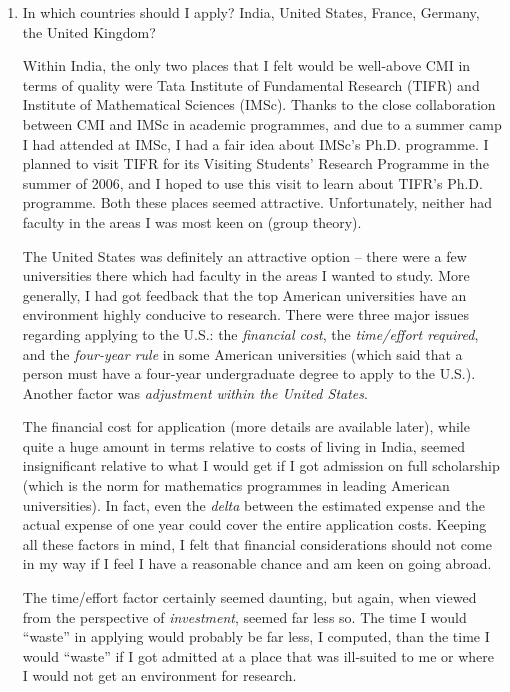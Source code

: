 \documentclass[a4paper]{amsart}
\begin{document}
\begin{enumerate}
\item In which countries should I apply? India, United States, France,
  Germany, the United Kingdom?

  Within India, the only two places that I felt would be well-above
  CMI in terms of quality were Tata Institute of Fundamental Research
  (TIFR) and Institute of Mathematical Sciences (IMSc). Thanks to the
  close collaboration between CMI and IMSc in academic programmes, and
  due to a summer camp I had attended at IMSc, I had a fair idea about
  IMSc's Ph.D. programme. I planned to visit TIFR for its Visiting
  Students' Research Programme in the summer of 2006, and I hoped to
  use this visit to learn about TIFR's Ph.D. programme. Both these
  places seemed attractive.  Unfortunately, neither had faculty in the
  areas I was most keen on (group theory).

  The United States was definitely an attractive option -- there were
  a few universities there which had faculty in the areas I wanted to
  study. More generally, I had got feedback that the top American
  universities have an environment highly conducive to research.
  There were three major issues regarding applying to the U.S.: the
  {\em financial cost}, the {\em time/effort required}, and the {\em
    four-year rule} in some American universities (which said that a
  person must have a four-year undergraduate degree to apply to the
  U.S.). Another factor was {\em adjustment within the United States}.

  The financial cost for application (more details are available
  later), while quite a huge amount in terms relative to costs of
  living in India, seemed insignificant relative to what I would get
  if I got admission on full scholarship (which is the norm for
  mathematics programmes in leading American universities). In fact,
  even the {\em delta} between the estimated expense and the actual
  expense of one year could cover the entire application costs.
  Keeping all these factors in mind, I felt that financial
  considerations should not come in my way if I feel I have a
  reasonable chance and am keen on going abroad.

  The time/effort factor certainly seemed daunting, but again, when
  viewed from the perspective of {\em investment}, seemed far less so.
  The time I would ``waste'' in applying would probably be far less, I
  computed, than the time I would ``waste'' if I got admitted at a
  place that was ill-suited to me or where I would not get an
  environment for research.


\end{enumerate}
\end{document}
